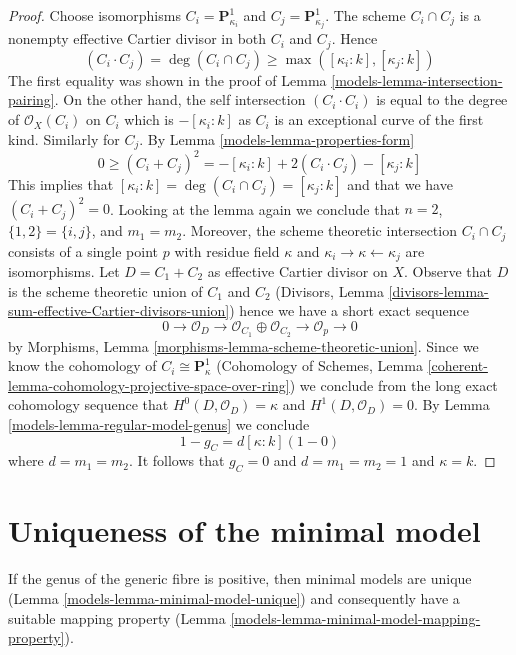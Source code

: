 \begin{proof}

Choose isomorphisms $C_i = \mathbf{P}^1_{\kappa_i}$ and
$C_j = \mathbf{P}^1_{\kappa_j}$. The scheme $C_i \cap C_j$
is a nonempty effective Cartier divisor in both $C_i$ and $C_j$.
Hence
$$
(C_i \cdot C_j) = \deg(C_i \cap C_j) \geq \max([\kappa_i: k], [\kappa_j : k])
$$
The first equality was shown in the proof of
Lemma \ref{models-lemma-intersection-pairing}.
On the other hand, the self intersection $(C_i \cdot C_i)$ is equal
to the degree of $\mathcal{O}_X(C_i)$ on $C_i$ which is $-[\kappa_i : k]$
as $C_i$ is an exceptional curve of the first kind. Similarly for
$C_j$. By Lemma \ref{models-lemma-properties-form}
$$
0 \geq (C_i + C_j)^2 = -[\kappa_i : k] + 2(C_i \cdot C_j) - [\kappa_j : k]
$$
This implies that $[\kappa_i : k] = \deg(C_i \cap C_j) = [\kappa_j : k]$
and that we have $(C_i + C_j)^2 = 0$. Looking at the lemma again
we conclude that $n = 2$, $\{1, 2\} = \{i, j\}$, and $m_1 = m_2$.
Moreover, the scheme theoretic intersection $C_i \cap C_j$ consists of
a single point $p$ with residue field $\kappa$ and
$\kappa_i \to \kappa \leftarrow \kappa_j$ are isomorphisms.
Let $D = C_1 + C_2$ as effective Cartier divisor on $X$.
Observe that $D$ is the scheme theoretic union of $C_1$ and $C_2$
(Divisors, Lemma \ref{divisors-lemma-sum-effective-Cartier-divisors-union})
hence we have a short exact sequence
$$
0 \to \mathcal{O}_D \to \mathcal{O}_{C_1} \oplus \mathcal{O}_{C_2} \to
\mathcal{O}_p \to 0
$$
by Morphisms, Lemma \ref{morphisms-lemma-scheme-theoretic-union}.
Since we know the cohomology of $C_i \cong \mathbf{P}^1_\kappa$
(Cohomology of Schemes, Lemma
\ref{coherent-lemma-cohomology-projective-space-over-ring})
we conclude from the long exact cohomology sequence that
$H^0(D, \mathcal{O}_D) = \kappa$ and
$H^1(D, \mathcal{O}_D) = 0$. By Lemma \ref{models-lemma-regular-model-genus}
we conclude
$$
1 - g_C = d[\kappa : k](1 - 0)
$$
where $d = m_1 = m_2$. It follows that $g_C = 0$ and $d = m_1 = m_2 = 1$
and $\kappa = k$.
\end{proof}

\section{Uniqueness of the minimal model}
\label{models-section-uniqueness}
If the genus of the generic fibre is positive, then minimal models are unique
(Lemma \ref{models-lemma-minimal-model-unique}) and consequently have a suitable
mapping property (Lemma \ref{models-lemma-minimal-model-mapping-property}).

